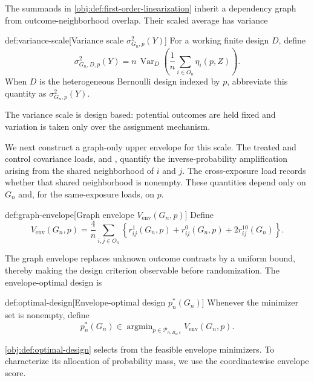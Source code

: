 The summands in \cref{obj:def:first-order-linearization} inherit a dependency graph from outcome-neighborhood overlap. Their scaled average has variance

\begin{definitionv}{def:variance-scale}[Variance scale $\sigma^2_{G_n,p}(Y)$]
For a working finite design $D$, define
\[
\sigma^2_{G_n,D,p}(Y)
=
n\,\operatorname{Var}_D\!\left(
\frac{1}{n}\sum_{i\in O_n}\eta_i(p,Z)
\right).
\]
When $D$ is the heterogeneous Bernoulli design indexed by $p$, abbreviate this quantity as $\sigma^2_{G_n,p}(Y)$.
\end{definitionv}

The variance scale  is design based: potential outcomes are held fixed and variation is taken only over the assignment mechanism.

We next construct a graph-only upper envelope for this scale. The treated and control covariance loads,  and , quantify the inverse-probability amplification arising from the shared neighborhood of \(i\) and \(j\). The cross-exposure load  records whether that shared neighborhood is nonempty. These quantities depend only on \(G_n\) and, for the same-exposure loads, on \(p\).

\begin{definitionv}{def:graph-envelope}[Graph envelope $V_{\mathrm{env}}(G_n,p)$]
Define
\[
V_{\mathrm{env}}(G_n,p)
=
\frac{4}{n}\sum_{i,j\in O_n}
\left\{
r_{ij}^1(G_n,p)
+
r_{ij}^0(G_n,p)
+
2r_{ij}^{10}(G_n)
\right\}.
\]
\end{definitionv}

The graph envelope  replaces unknown outcome contrasts by a uniform bound, thereby making the design criterion observable before randomization. The envelope-optimal design is

\begin{definitionv}{def:optimal-design}[Envelope-optimal design $p_n^*(G_n)$]
Whenever the minimizer set is nonempty, define
\[
p_n^*(G_n)
\in
\operatorname{argmin}_{p\in\mathcal P_{n,B_n,\epsilon}}
V_{\mathrm{env}}(G_n,p).
\]
\end{definitionv}

\cref{obj:def:optimal-design} selects  from the feasible envelope minimizers. To characterize its allocation of probability mass, we use the coordinatewise envelope score.

